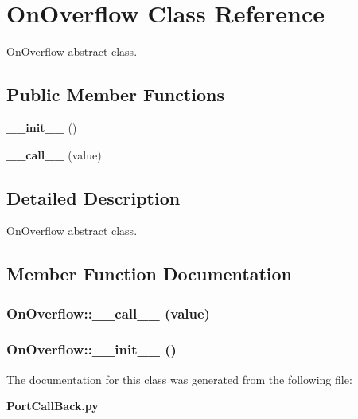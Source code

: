 \section{On\-Overflow Class Reference}
\label{classOnOverflow}
On\-Overflow abstract class.  


\subsection*{Public Member Functions}
\begin{CompactItemize}
\item 
{\bf \_\-\_\-init\_\-\_\-} ()
\item 
{\bf \_\-\_\-call\_\-\_\-} (value)
\end{CompactItemize}


\subsection{Detailed Description}
On\-Overflow abstract class. 



\subsection{Member Function Documentation}
\subsubsection{\setlength{\rightskip}{0pt plus 5cm}On\-Overflow::\_\-\_\-call\_\-\_\- (value)}\label{classOnOverflow_OnOverflowa1}


\subsubsection{\setlength{\rightskip}{0pt plus 5cm}On\-Overflow::\_\-\_\-init\_\-\_\- ()}\label{classOnOverflow_OnOverflowa0}




The documentation for this class was generated from the following file:\begin{CompactItemize}
\item 
{\bf Port\-Call\-Back.py}\end{CompactItemize}
